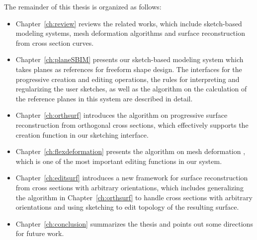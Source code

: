 The remainder of this thesis is organized as follows:
\begin{itemize}
\item Chapter~\ref{ch:review} reviews the related works, which include
 sketch-based modeling systems, mesh deformation algorithms and
  surface reconstruction from cross section curves.

\item Chapter~\ref{ch:planeSBIM} presents our sketch-based modeling
system which takes planes as references for freeform shape design.
The interfaces for the progressive creation and editing operations,
the rules for interpreting and regularizing the user sketches, as well as
 the algorithm on the calculation of the reference planes in this system are
 described in detail.

\item Chapter~\ref{ch:orthsurf} introduces the algorithm on progressive
surface reconstruction from orthogonal cross sections, which effectively
 supports the creation function in our sketching interface.

\item Chapter~\ref{ch:flexdeformation} presents the algorithm on
mesh deformation , which is one of the most important editing functions in our system.

\item Chapter~\ref{ch:editsurf} introduces a new framework for
surface reconstruction from cross sections with arbitrary
orientations, which includes generalizing the algorithm in
Chapter~\ref{ch:orthsurf} to handle cross
 sections with arbitrary orientations and using sketching  to edit
 topology of the resulting surface.

\item Chapter~\ref{ch:conclusion} summarizes the thesis and points out some
directions for future work.
\end{itemize}
